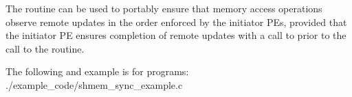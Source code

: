 \begin{apidefinition}
{    The  routine can be used to portably ensure that
    memory access operations observe remote updates in the order enforced by the
    initiator \acp{PE}, provided that the initiator PE ensures completion of remote
    updates with a call to  prior to the call to the
     routine.
}

\begin{apiexamples}

\apicexample
    {The following  and  example is
    for \Cstd[11] programs:}
    {./example_code/shmem_sync_example.c}
    {}

\end{apiexamples}

\end{apidefinition}
